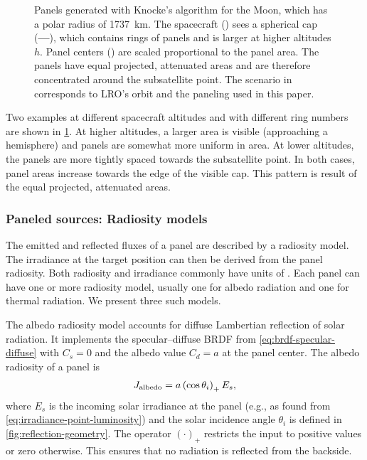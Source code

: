 \begin{figure}[t]
   \caption{Panels generated with Knocke's algorithm for the Moon, which has a polar radius of \qty{1737}{\km}. The spacecraft (\textcolor{mpl-pink}{}) sees a spherical cap (\textcolor{mpl-red}{\textbf{---}}), which contains rings of panels and is larger at higher altitudes $h$. Panel centers (\textcolor{mpl-lightblue}{}) are scaled proportional to the panel area. The panels have equal projected, attenuated areas and are therefore concentrated around the subsatellite point. The scenario in \protect{} corresponds to LRO's orbit and the paneling used in this paper.}
   \label{fig:general-knocke-paneling}
\end{figure}

Two examples at different spacecraft altitudes and with different ring numbers are shown in \cref{fig:general-knocke-paneling}. At higher altitudes, a larger area is visible (approaching a hemisphere) and panels are somewhat more uniform in area. At lower altitudes, the panels are more tightly spaced towards the subsatellite point. In both cases, panel areas increase towards the edge of the visible cap. This pattern is result of the equal projected, attenuated areas.

\subsubsection{Paneled sources: Radiosity models}
The emitted and reflected fluxes of a panel are described by a radiosity model. The irradiance at the target position can then be derived from the panel radiosity. Both radiosity and irradiance commonly have units of \unit{\irr}. Each panel can have one or more radiosity model, usually one for albedo radiation and one for thermal radiation. We present three such models.

The albedo radiosity model accounts for diffuse Lambertian reflection of solar radiation. It implements the specular--diffuse \gls{BRDF} from \cref{eq:brdf-specular-diffuse} with $C_s = 0$ and the albedo value $C_d = a$ at the panel center. The albedo radiosity of a panel is~\cite{Knocke1988}
\begin{align}
    \label{eq:radiosity-albedo}
    J_\textnormal{albedo} = a \left(\cos\theta_i\right)_+ E_s,
\end{align}
where $E_s$ is the incoming solar irradiance at the panel (e.g., as found from \cref{eq:irradiance-point-luminosity}) and the solar incidence angle $\theta_i$ is defined in \cref{fig:reflection-geometry}. The operator $(\cdot)_+$ restricts the input to positive values or zero otherwise. This ensures that no radiation is reflected from the backside.

